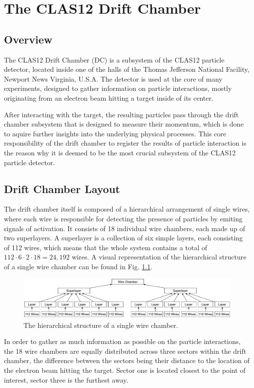 \chapter{The CLAS12 Drift Chamber}

\section{Overview}

The CLAS12 Drift Chamber (DC) is a subsystem of the CLAS12 particle
detector, located inside one of the halls of the Thomas
Jefferson National Facility, Newport News Virginia, U.S.A. The
detector is used at the core of many experiments, designed to gather
information on particle interactions, mostly originating from an
electron beam hitting a target inside of its center.

After interacting with the target, the resulting particles pass
through the drift chamber subsystem that is designed to measure their
momentum, which is done to aquire further insights into the underlying
physical processes. This core responsibility of the drift chamber to
register the results of particle interaction is the reason why it is
deemed to be the most crucial subsystem of the CLAS12 particle
detector.

\section{Drift Chamber Layout}

The drift chamber itself is composed of a hierarchical arrangement of
single wires, where each wire is responsible for detecting the presence of
particles by emiting signals of activation. It consists of 18
individual wire chambers, each made up of two superlayers. A
superlayer is a collection of six simple layers, each consisting of
112 wires, which means that the whole system contains a total of
\(112 \cdot 6 \cdot 2 \cdot 18 = 24,192\) wires.
A visual representation of the hierarchical structure of a
single wire chamber can be found in Fig. \ref{fig:wire-chamber}.
\begin{figure}[h]
  \centering
  \includegraphics[width=\textwidth]{../figures/wire_chamber}
  \caption{The hierarchical structure of a single wire chamber.}
  \label{fig:wire-chamber}
\end{figure}

In order to gather as much information as possible on the particle
interactions, the 18 wire chambers are equally distributed across
three sectors within the drift chamber, the difference between the
sectors being their distance to the location of the electron beam hitting
the target. Sector one is located closest to the point of interest,
sector three is the furthest away.
